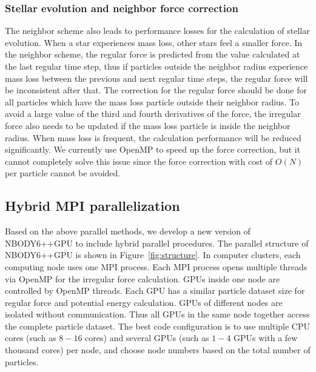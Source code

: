 \documentclass[usenatbib,aas_macros]{mn2e}
\def\nbodyppgpu{NBODY6++GPU }
\begin{document}
\subsubsection{ Stellar evolution and neighbor force correction}
The neighbor scheme also leads to performance losses for the calculation of stellar evolution. When a star experiences mass loss, other stars feel a smaller force. 
In the neighbor scheme, the regular force is predicted from the value calculated at the last regular time step, 
thus if particles outside the neighbor radius experience mass loss between the previous and next regular time steps, the regular force will be inconsistent after that. 
The correction for the regular force should be done for all particles which have the mass loss particle outside their neighbor radius. 
To avoid a large value of the third and fourth derivatives of the force, the irregular force also needs to be updated if the mass loss particle is inside the neighbor radius. 
When mass loss is frequent, the calculation performance will be reduced significantly. 
We currently use OpenMP to speed up the force correction, but it cannot completely solve this issue since the force correction with cost of $O(N)$ per particle cannot be avoided. 

\subsection{ Hybrid MPI parallelization}

Based on the above parallel methods, we develop a new version of \nbodyppgpu to include hybrid parallel procedures. 
The parallel structure of \nbodyppgpu is shown in Figure~\ref{fig:structure}. 
In computer clusters, each computing node uses one MPI process. 
Each MPI process opens multiple threads via OpenMP for the irregular force calculation. 
GPUs inside one node are controlled by OpenMP threads. 
Each GPU has a similar particle dataset size for regular force and potential energy calculation. 
GPUs of different nodes are isolated without communication. 
Thus all GPUs in the same node together access the complete particle dataset. 
The best code configuration is to use multiple CPU cores (such as $8-16$ cores) and several GPUs (such as $1-4$ GPUs with a few thousand cores) per node, and choose node numbers based on the total number of particles.
\end{document}
